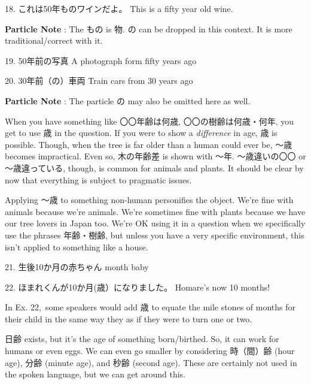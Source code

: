 \par{18. これは50年ものワインだよ。 \hfill\break
This is a fifty year old wine. }

\par{\textbf{Particle Note }: The もの is 物. の can be dropped in this context. It is more traditional\slash correct with it. }

\par{19. 50年前の写真 \hfill\break
A photograph form fifty years ago }

\par{20. 30年前（の）車両 \hfill\break
Train cars from 30 years ago }

\par{\textbf{Particle Note }: The particle の may also be omitted here as well. }

\par{ When you have something like 〇〇年齢は何歳, 〇〇の樹齢は何歳・何年, you get to use 歳 in the question. If you were to show a \emph{difference }in age, 歳 is possible. Though, when the tree is far older than a human could ever be, ～歳 becomes impractical. Even so, 木の年齢差 is shown with ～年. ～歳違いの〇〇 or ～歳違っている, though, is common for animals and plants. It should be clear by now that everything is subject to pragmatic issues. }

\par{  Applying ～歳 to something non-human personifies the object. We're fine with animals because we're animals. We're sometimes fine with plants because we have our tree lovers in Japan too. We're OK using it in a question when we specifically use the phrases 年齢・樹齢, but unless you have a very specific environment, this isn't applied to something like a house. }

\par{21. 生後10か月の赤ちゃん \hfill{} month baby }

\par{22. ほまれくんが10か月(歳）になりました。 \hfill\break
Homare's now 10 months! }

\par{ In Ex. 22, some speakers would add 歳 to equate the mile stones of months for their child in the same way they as if they were to turn one or two. }

\par{ 日齢 exists, but it's the age of something born\slash birthed. So, it can work for humans or even eggs. We can even go smaller by considering 時（間）齢 (hour age), 分齢 (minute age), and 秒齢 (second age). These are certainly not used in the spoken language, but we can get around this. }

